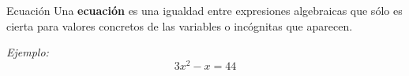 \begin{infocard}{Ecuación}
    Una \textbf{ecuación} es una igualdad entre expresiones algebraicas que sólo es cierta
    para valores concretos de las variables o incógnitas que aparecen.

    \emph{Ejemplo:}\[3x^2-x=44\]
\end{infocard}